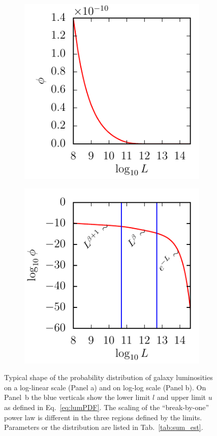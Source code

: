\begin{figure}
	\begin{subfigure}[c]{0.45\textwidth}
		\includegraphics{fig/lumfunc_loglin}
		\caption{}
	\end{subfigure}
	\begin{subfigure}[c]{0.45\textwidth}
		\includegraphics{fig/lumfunc_loglog}
		\caption{}
	\end{subfigure}
	\caption{Typical shape of the probability distribution of galaxy luminosities on a log-linear scale (Panel a) and on log-log scale (Panel b). On Panel~b the blue verticals show the lower limit $l$ and upper limit $u$ as defined in Eq.~\ref{eq:lumPDF}. The scaling of the ``break-by-one'' power law is different in the three regions defined by the limits. Parameters or the distribution are listed in Tab.~\ref{tab:sum_est}.}
	\label{fig:lumfunc}
\end{figure}

